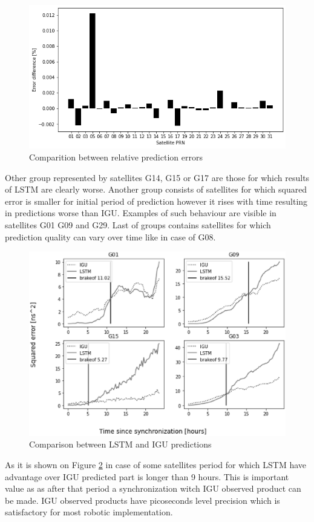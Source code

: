 \documentclass{kybernetika}
\begin{document}
\begin{figure}[htb!] 
\centering
	\includegraphics[width=\textwidth]{figures/rel_err_diff}
\caption{Comparition between relative prediction errors}
\label{fig:relative_error_comparition}
\end{figure}

Other group represented by satellites G14, G15 or G17 are those  for which results of LSTM 
are clearly worse. Another group consists of satellites for which 
squared error is smaller for initial period of prediction however it rises with time resulting
in predictions worse than IGU. Examples of such behaviour are visible in satellites G01
G09 and G29. Last of groups contains satellites for which prediction quality can vary over
time like in case of G08.
\begin{figure}[htb] 
\centering
	\includegraphics[width=\textwidth]{figures/brakeoff_compare}
\caption{Comparison between LSTM and IGU predictions}
\label{fig:cutoff}
\end{figure}
As it is shown on Figure \ref{fig:cutoff} in case of some satellites period for which LSTM
have advantage over IGU predicted part is longer than 9 hours. This is important value as 
as after that period a synchronization witch IGU observed product can be made.
IGU observed products have picoseconds level precision which is satisfactory for most 
robotic implementation.
\end{document}

